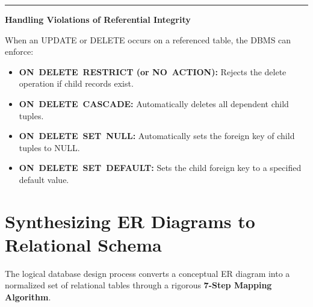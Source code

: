 \documentclass[11pt,a4paper]{article}
\newcommand{\ic}[1]{\mbox{\colorbox{AnthCodeBG}{\footnotesize\ttfamily\textcolor{AnthBlue}{#1}}}}
\newcommand{\concept}[1]{%
  \vspace{3pt}\noindent\textcolor{AnthGreen}{\rule{3.5pt}{10pt}}\enspace
  \textbf{\sffamily\color{AnthDark}#1}\par\vspace{2pt}%
}
\begin{document}
\concept{Handling Violations of Referential Integrity}
When an \ic{UPDATE} or \ic{DELETE} occurs on a referenced table, the DBMS can enforce:
\begin{itemize}
  \item \textbf{\ic{ON DELETE RESTRICT} (or \ic{NO ACTION}):} Rejects the delete operation if child records exist.
  \item \textbf{\ic{ON DELETE CASCADE}:} Automatically deletes all dependent child tuples.
  \item \textbf{\ic{ON DELETE SET NULL}:} Automatically sets the foreign key of child tuples to NULL.
  \item \textbf{\ic{ON DELETE SET DEFAULT}:} Sets the child foreign key to a specified default value.
\end{itemize}

\clearpage
\section{Synthesizing ER Diagrams to Relational Schema}

The logical database design process converts a conceptual ER diagram into a normalized set of relational tables through a rigorous \textbf{7-Step Mapping Algorithm}.
\end{document}

